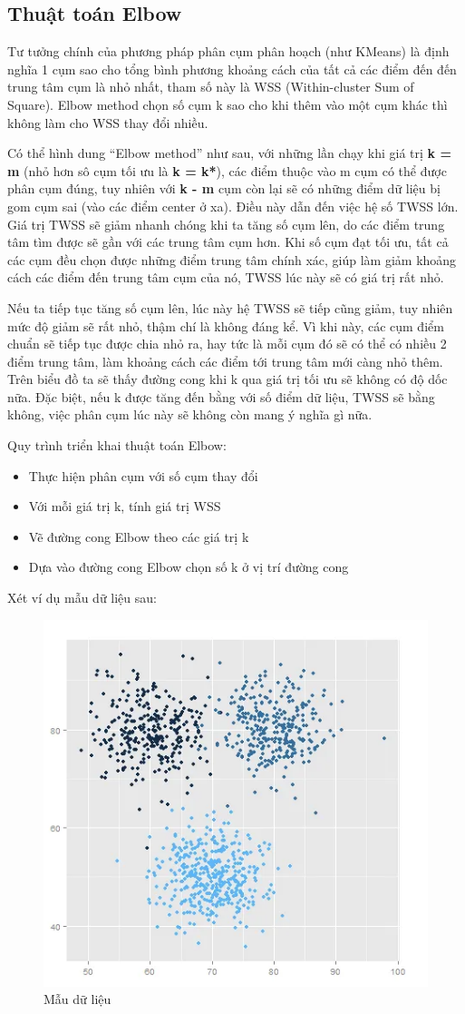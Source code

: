 \documentclass{article}
\begin{document}
	\subsection{Thuật toán Elbow}
	Tư tưởng chính của phương pháp phân cụm phân hoạch (như KMeans) là định nghĩa 1 cụm sao cho tổng bình phương khoảng cách của tất cả các điểm đến đến trung tâm cụm là nhỏ nhất, tham số này là WSS (Within-cluster Sum of Square). Elbow method chọn số cụm k sao cho khi thêm vào  một cụm khác thì không làm cho WSS thay đổi nhiều.\par
	\newpage
	Có thể hình dung “Elbow method” như sau, với những lần chạy khi giá trị \textbf{k = m} (nhỏ hơn sô cụm tối ưu là \textbf{k = k*}), các điểm thuộc vào m cụm có thể được phân cụm đúng, tuy nhiên với \textbf{k - m} cụm còn lại sẽ có những điểm dữ liệu bị gom cụm sai (vào các điểm center ở xa). Điều này dẫn đến việc hệ số TWSS lớn. Giá trị TWSS sẽ giảm nhanh chóng khi ta tăng số cụm lên, do các điểm trung tâm tìm được sẽ gần với các trung tâm cụm hơn. Khi số cụm đạt tối ưu, tất cả các cụm đều chọn được những điểm trung tâm chính xác, giúp làm giảm khoảng cách các điểm đến trung tâm cụm của nó, TWSS lúc này sẽ có giá trị rất nhỏ.\par
	\medskip
	Nếu ta tiếp tục tăng số cụm lên, lúc này hệ TWSS sẽ tiếp cũng giảm, tuy nhiên mức độ giảm sẽ rất nhỏ, thậm chí là không đáng kể. Vì khi này, các cụm điểm chuẩn sẽ tiếp tục được chia nhỏ ra, hay tức là mỗi cụm đó sẽ có thể có nhiều 2 điểm trung tâm, làm khoảng cách các điểm tới trung tâm mới càng nhỏ thêm. Trên biểu đồ ta sẽ thấy đường cong khi k qua giá trị tối ưu sẽ không có độ dốc nữa. Đặc biệt, nếu k được tăng đến bằng với số điểm dữ liệu, TWSS sẽ bằng không, việc phân cụm lúc này sẽ không còn mang ý nghĩa gì nữa.\par
	\medskip
	Quy trình triển khai thuật toán Elbow:
	\begin{itemize}
		\item Thực hiện phân cụm với số cụm thay đổi
		\item Với mỗi giá trị k, tính giá trị WSS
		\item Vẽ đường cong Elbow theo các giá trị k
		\item Dựa vào đường cong Elbow chọn số k ở vị trí đường cong
	\end{itemize}
	\newpage
	Xét ví dụ mẫu dữ liệu sau:
	\begin{figure}[h]
		\centering
		\includegraphics[width=0.5\linewidth]{img/data_set_1}
		\caption{Mẫu dữ liệu}
	\end{figure}\par
\end{document}
